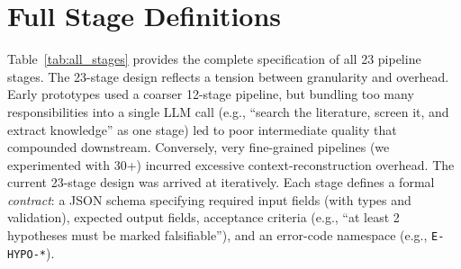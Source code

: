 \documentclass{llmxive}
\providecommand{\eg}{e.g.,\xspace}
\providecommand{\beginappendix}{\appendix{\huge\ttfamily Appendix\par}}
\begin{document}





\beginappendix

% 

\section{Full Stage Definitions}
\label{app:stages}

Table~\ref{tab:all_stages} provides the complete specification of all 23 pipeline
stages. The 23-stage design reflects a tension between granularity and overhead.
Early prototypes used a coarser 12-stage pipeline, but bundling too many
responsibilities into a single LLM call (\eg{} ``search the literature, screen it,
and extract knowledge'' as one stage) led to poor intermediate quality that
compounded downstream. Conversely, very fine-grained pipelines (we experimented
with 30+) incurred excessive context-reconstruction overhead. The current 23-stage
design was arrived at iteratively. Each stage defines a formal \emph{contract}: a
JSON schema specifying required input fields (with types and validation), expected
output fields, acceptance criteria (\eg{} ``at least 2 hypotheses must be marked
falsifiable''), and an error-code namespace (\eg{} \texttt{E-HYPO-*}).
\end{document}
